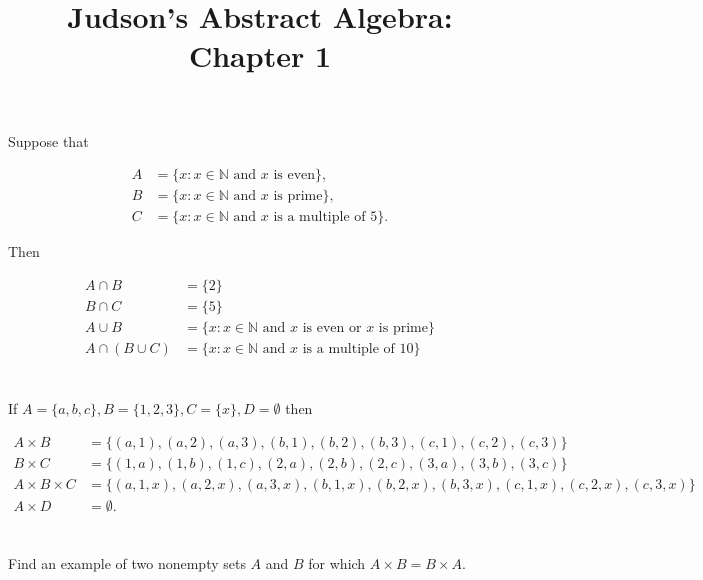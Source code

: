 \documentclass[a4paper]{article}
\title{Judson's Abstract Algebra: Chapter 1}
\date{}
\begin{document}
\maketitle

\section{}

Suppose that 

\begin{align*}
A &= \{ x : x \in \mathbb{N} \text{ and } x \text{ is even}\}, \\
B &= \{ x : x \in \mathbb{N} \text{ and } x \text{ is prime}\}, \\
C &= \{ x : x \in \mathbb{N} \text{ and } x \text{ is a multiple of 5}\}.
\end{align*}

Then

\begin{align*}
A \cap B &= \{ 2 \} \\
B \cap C &= \{ 5 \} \\
A \cup B &= \{ x : x \in \mathbb{N} \text{ and } x \text{ is even or } x \text{ is prime}\} \\
A \cap (B \cup C) &= \{ x : x \in \mathbb{N} \text{ and } x \text{ is a multiple of 10}\}
\end{align*}


\section{}

If $A = \{ a, b, c \}, B = \{ 1, 2, 3 \}, C = \{ x \}, D = \emptyset$ then

\begin{align*}
A \times B &= \{ (a,1), (a,2), (a,3), (b,1), (b,2), (b,3), (c,1), (c,2), (c,3)\} \\
B \times C &= \{ (1,a), (1,b), (1,c), (2,a), (2,b), (2,c), (3,a), (3,b), (3,c)\} \\
A \times B \times C &= \{ (a,1,x), (a,2,x), (a,3,x), (b,1,x), (b,2,x), (b,3,x), (c,1,x), (c,2,x), (c,3,x)\} \\
A \times D &= \emptyset.
\end{align*}


\section{}

Find an example of two nonempty sets $A$ and $B$ for which $A \times B = B \times A$.
\end{document}
